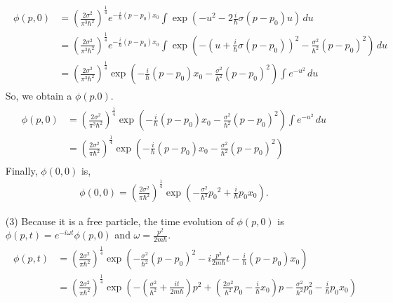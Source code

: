 \documentclass[floatfix,nofootinbib,superscriptaddress,fleqn]{revtex4}
\begin{document}
\begin{itemize}
\begin{align*}
\begin{split}
      \phi(p,0) &= {\left(\frac{2\sigma^2}{\pi^3\hbar^2}\right)}^{\frac{1}{4}}
      e^{-\frac{i}{\hbar}(p-p_0)x_0}
      \int\exp\left(-u^2-2\frac{i}{\hbar}\sigma (p-p_0)u\right)\,du \\
      &={\left(\frac{2\sigma^2}{\pi^3\hbar^2}\right)}^{\frac{1}{4}}
      e^{-\frac{i}{\hbar}(p-p_0)x_0}  
      \int\exp\left(-{\left( u+\frac{i}{\hbar}\sigma (p-p_0)\right)}^2
      -\frac{\sigma^2}{\hbar^2}(p-p_0)^2\right)\,du \\
      &= {\left(\frac{2\sigma^2}{\pi^3\hbar^2}\right)}^{\frac{1}{4}}
      \exp\left( -\frac{i}{\hbar}(p-p_0)x_0
      -\frac{\sigma^2}{\hbar^2}(p-p_0)^2 \right)
      \int e^{-u^2}\,du
    \end{split}
  \end{align*}
  So, we obtain a $\phi(p.0)$.
  \begin{align*}
    \begin{split}
      \phi(p,0) &= {\left(\frac{2\sigma^2}{\pi^3\hbar^2}\right)}
      ^{\frac{1}{4}}
      \exp\left( -\frac{i}{\hbar}(p-p_0)x_0
      -\frac{\sigma^2}{\hbar^2}(p-p_0)^2 \right)
      \int e^{-u^2}\,du \\
      &= {\left(\frac{2\sigma^2}{\pi\hbar^2}\right)}^{\frac{1}{4}}
      \exp\left( -\frac{i}{\hbar}(p-p_0)x_0
      -\frac{\sigma^2}{\hbar^2}(p-p_0)^2 \right)
    \end{split}
  \end{align*}
  Finally, $\phi(0,0)$ is,
  \begin{align}
    \phi(0,0) = {\left(\frac{2\sigma^2}{\pi\hbar^2}\right)}^{\frac{1}{4}}
    \exp\left(-\frac{\sigma^2}{\hbar^2}{p_0}^2+\frac{i}{\hbar}p_0x_0\right).
  \end{align}
  \item[(3)]Because it is a free particle, the time evolution of 
  $\phi(p,0)$ is $\phi(p,t)=e^{-i\omega t}\phi(p,0)$ 
  and $\omega = \frac{p^2}{2m\hbar}$.
  \begin{align*}
    \begin{split} 
      \phi(p,t) &={\left(\frac{2\sigma^2}{\pi\hbar^2}\right)}^{\frac{1}{4}}
      \exp\left(-\frac{\sigma^2}{\hbar^2}(p-p_0)^2-i\frac{p^2}{2m\hbar}t
      -\frac{i}{\hbar}(p-p_0)x_0 \right) \\
      &={\left(\frac{2\sigma^2}{\pi\hbar^2}\right)}^{\frac{1}{4}}
      \exp\left(-\left(\frac{\sigma^2}{\hbar^2} 
      +\frac{it}{2m\hbar}\right)p^2 
      +\left(\frac{2\sigma^2}{\hbar^2}p_0-\frac{i}{\hbar}x_0\right)p 
      -\frac{\sigma^2}{\hbar^2}p_0^2-\frac{i}{\hbar}p_0x_0 \right) \\ 

\end{split}
\end{align*}
\end{itemize}
\end{document}
